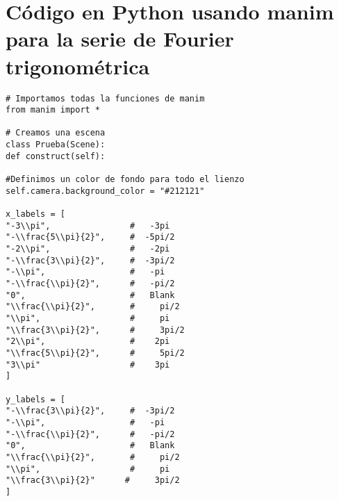 \section{Código en Python usando manim para la serie de Fourier trigonométrica} \label{app3:trig-code-python-manim}
\begin{longlisting}
	\begin{verbatim}
# Importamos todas la funciones de manim
from manim import *

# Creamos una escena
class Prueba(Scene):
def construct(self):

#Definimos un color de fondo para todo el lienzo
self.camera.background_color = "#212121" 

x_labels = [
"-3\\pi",                #   -3pi
"-\\frac{5\\pi}{2}",     #  -5pi/2
"-2\\pi",                #   -2pi
"-\\frac{3\\pi}{2}",     #  -3pi/2
"-\\pi",                 #   -pi
"-\\frac{\\pi}{2}",      #   -pi/2
"0",                     #   Blank
"\\frac{\\pi}{2}",       #     pi/2
"\\pi",                  #     pi
"\\frac{3\\pi}{2}",      #     3pi/2
"2\\pi",                 #    2pi
"\\frac{5\\pi}{2}",      #     5pi/2
"3\\pi"                  #    3pi
]

y_labels = [
"-\\frac{3\\pi}{2}",     #  -3pi/2
"-\\pi",                 #   -pi
"-\\frac{\\pi}{2}",      #   -pi/2
"0",                     #   Blank
"\\frac{\\pi}{2}",       #     pi/2
"\\pi",                  #     pi
"\\frac{3\\pi}{2}"      #     3pi/2	
]


\end{verbatim}
\end{longlisting}
